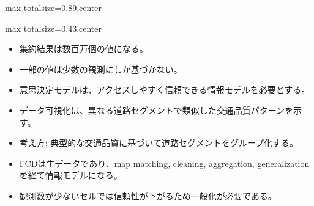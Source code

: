 \begin{minipage}[t]{0.58\textwidth}
\begin{adjustbox}{max totalsize={\textwidth}{0.89\textheight},center}
\begin{minipage}{\textwidth}
\end{minipage}
\end{adjustbox}
\end{minipage}


\clearpage
{}
\begin{minipage}[t]{0.405\textwidth}
\begin{adjustbox}{max totalsize={\textwidth}{0.43\textheight},center}
\begin{minipage}{\textwidth}\scriptsize
{}\begin{itemize}
\item 集約結果は数百万個の値になる。
\item 一部の値は少数の観測にしか基づかない。
\item 意思決定モデルは、アクセスしやすく信頼できる情報モデルを必要とする。
\item データ可視化は、異なる道路セグメントで類似した交通品質パターンを示す。
\item 考え方: 典型的な交通品質に基づいて道路セグメントをグループ化する。
\end{itemize}\begin{itemize}
\item FCDは生データであり、map matching, cleaning, aggregation, generalization を経て情報モデルになる。
\item 観測数が少ないセルでは信頼性が下がるため一般化が必要である。
\end{itemize}
\end{minipage}
\end{adjustbox}
\end{minipage}\hfill

